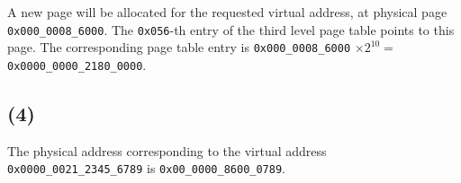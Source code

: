 \documentclass[a4paper,12pt]{article}
\begin{document}
A new page will be allocated for the requested virtual address, at physical page \\ \texttt{0x000\_0008\_6000}. The \texttt{0x056}-th entry of the third level page table points to this page. The corresponding page table entry is \texttt{0x000\_0008\_6000} $\times 2^{10} =$ \\ \texttt{0x0000\_0000\_2180\_0000}.

\subsection*{(4)}

The physical address corresponding to the virtual address \texttt{0x0000\_0021\_2345\_6789} is \texttt{0x00\_0000\_8600\_0789}.
\end{document}
